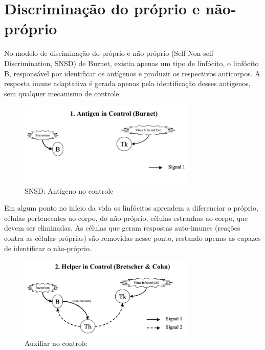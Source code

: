 \section{Discriminação do próprio e não-próprio}

No modelo de disciminação do próprio e não próprio (Self Non-self Discrimination, SNSD) de Burnet, existia apenas um tipo de linfócito, o linfócito B, responsável por identificar os antígenos e produzir os respectivos anticorpos. A resposta imune adaptativa é gerada apenas pela identificação desses antígenos, sem qualquer mecanismo de controle.

\begin{figure}[h!]
    \vspace{1cm}
    \centering
    \includegraphics[width=0.75\textwidth]{img/signals1-antigen.png}
    \caption{SNSD: Antígeno no controle \cite{Aickelin2002}}
    \label{img:signals-first}
    \vspace{1cm}
\end{figure}

Em algum ponto no início da vida os linfócitos aprendem a diferenciar o próprio, células pertencentes ao corpo, do não-próprio, células estranhas ao corpo, que devem ser eliminadas. As células que geram respostas auto-imunes (reações contra as células próprias) são removidas nesse ponto, restando apenas as capazes de identificar o não-próprio.

\begin{figure}[h!]
    \vspace{1cm}
    \centering
    \includegraphics[width=0.75\textwidth]{img/signals2-helper.png}
    \caption{Auxiliar no controle \cite{Aickelin2002}}
    \label{fig:nis_helper}
    \vspace{1cm}
\end{figure}

